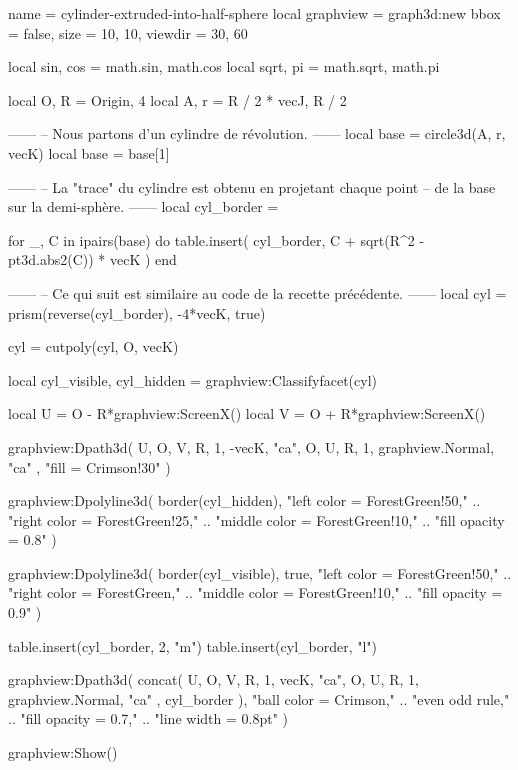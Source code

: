 \documentclass{standalone}
\begin{document}
\begin{luadraw}{name = cylinder-extruded-into-half-sphere}
local graphview = graph3d:new{
  bbox    = false,
  size    = {10, 10},
  viewdir = {30, 60}
}

local sin, cos = math.sin, math.cos
local sqrt, pi = math.sqrt, math.pi

local O, R = Origin, 4
local A, r = R / 2 * vecJ, R / 2

------
-- Nous partons d'un cylindre de révolution.
------
local base = circle3d(A, r, vecK)
local base = base[1]

------
-- La "trace" du cylindre est obtenu en projetant chaque point
-- de la base sur la demi-sphère.
------
local cyl_border = {}

for _, C in ipairs(base) do
  table.insert(
    cyl_border,
    C + sqrt(R^2 - pt3d.abs2(C)) * vecK
  )
end

------
-- Ce qui suit est similaire au code de la recette précédente.
------
local cyl = prism(reverse(cyl_border), -4*vecK, true)

cyl = cutpoly(cyl, {O, vecK})

local cyl_visible, cyl_hidden = graphview:Classifyfacet(cyl)

local U = O - R*graphview:ScreenX()
local V = O + R*graphview:ScreenX()

graphview:Dpath3d(
  {
    U, O, V, R, 1, -vecK, "ca",
    O, U, R, 1, graphview.Normal, "ca"
  },
  "fill = Crimson!30"
)

graphview:Dpolyline3d(
  border(cyl_hidden),
     "left color = ForestGreen!50,"
  .. "right color = ForestGreen!25,"
  .. "middle color = ForestGreen!10,"
  .. "fill opacity = 0.8"
)

graphview:Dpolyline3d(
  border(cyl_visible),
  true,
     "left color = ForestGreen!50,"
  .. "right color = ForestGreen,"
  .. "middle color = ForestGreen!10,"
  .. "fill opacity = 0.9"
)

table.insert(cyl_border, 2, "m")
table.insert(cyl_border, "l")

graphview:Dpath3d(
  concat(
    {
      U, O, V, R, 1, vecK, "ca",
      O, U, R, 1, graphview.Normal, "ca"
    },
    cyl_border
  ),
     "ball color = Crimson,"
  .. "even odd rule,"
  .. "fill opacity = 0.7,"
  .. "line width = 0.8pt"
)

graphview:Show()
\end{luadraw}
\end{document}
